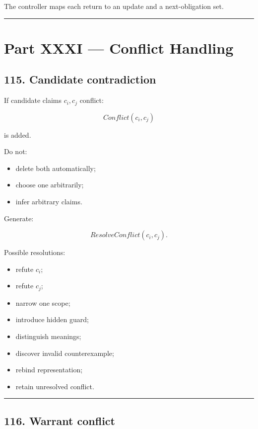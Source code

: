 \documentclass[
]{article}
\providecommand{\tightlist}{%
  \setlength{\itemsep}{0pt}\setlength{\parskip}{0pt}}
\begin{document}
The controller maps each return to an update and a next-obligation set.

\begin{center}\rule{0.5\linewidth}{0.5pt}\end{center}

\section{Part XXXI --- Conflict
Handling}\label{part-xxxi-conflict-handling}

\subsection{115. Candidate contradiction}\label{candidate-contradiction}

If candidate claims \(c_i,c_j\) conflict:

\[
\boxed{
Conflict(c_i,c_j)
}
\]

is added.

Do not:

\begin{itemize}
\tightlist
\item
  delete both automatically;
\item
  choose one arbitrarily;
\item
  infer arbitrary claims.
\end{itemize}

Generate:

\[
\boxed{
ResolveConflict(c_i,c_j).
}
\]

Possible resolutions:

\begin{itemize}
\tightlist
\item
  refute \(c_i\);
\item
  refute \(c_j\);
\item
  narrow one scope;
\item
  introduce hidden guard;
\item
  distinguish meanings;
\item
  discover invalid counterexample;
\item
  rebind representation;
\item
  retain unresolved conflict.
\end{itemize}

\begin{center}\rule{0.5\linewidth}{0.5pt}\end{center}

\subsection{116. Warrant conflict}\label{warrant-conflict}
\end{document}
